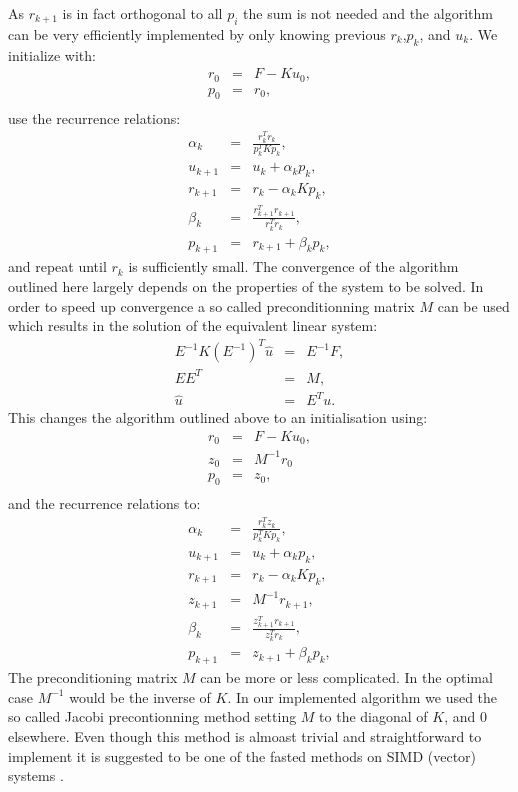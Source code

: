 As $r_{k+1}$ is in fact orthogonal to all $p_i$ the sum is not needed
and the algorithm can be very efficiently implemented by only knowing
previous $r_k$,$p_k$, and $u_k$. We initialize with:
\begin{eqnarray}
  r_0&=&F - Ku_0, \\
  p_0&=&r_0, \\
\end{eqnarray}
use the recurrence relations:
\begin{eqnarray}
  \alpha_k&=&\frac{r_k^{T}r_k}{p_k^{T}Kp_k}, \label{eqn-rec-1} \\
  u_{k+1}&=&u_{k}+\alpha_kp_k, \label{eqn-rec-2} \\
  r_{k+1}&=&r_k - \alpha_kKp_k, \label{eqn-rec-3} \\
  \beta_k&=&\frac{r_{k+1}^Tr_{k+1}}{r_k^Tr_k}, \label{eqn-rec-4} \\
  p_{k+1}&=&r_{k+1}+\beta_kp_{k} \label{eqn-rec-5},
\end{eqnarray}
and repeat until $r_k$ is sufficiently small. The convergence of the
algorithm outlined here largely depends on the properties of the
system to be solved. In order to speed up convergence a so called
preconditionning matrix $M$ can be used which results in the solution
of the equivalent linear system:
\begin{eqnarray}
  E^{-1}K(E^{-1})^T\hat{u}&=&E^{-1}F, \\
  EE^{T}&=&M, \\
  \hat{u}&=&E^Tu.
\end{eqnarray}
This changes the algorithm outlined above to an initialisation using:
\begin{eqnarray}
  r_0&=&F - Ku_0, \\
  z_0&=&M^{-1}r_0 \\
  p_0&=&z_0, \\
\end{eqnarray}
and the recurrence relations to:
\begin{eqnarray}
  \alpha_k&=&\frac{r_k^{T}z_k}{p_k^{T}Kp_k}, \label{eqn-recm-1} \\
  u_{k+1}&=&u_{k}+\alpha_kp_k, \label{eqn-recm-2} \\
  r_{k+1}&=&r_k - \alpha_kKp_k, \label{eqn-recm-3} \\
  z_{k+1}&=&M^{-1}r_{k+1}, \label{eqn-recm-4} \\
  \beta_k&=&\frac{z_{k+1}^Tr_{k+1}}{z_k^Tr_k}, \label{eqn-recm-5} \\
  p_{k+1}&=&z_{k+1}+\beta_kp_{k} \label{eqn-recm-6},
\end{eqnarray}
The preconditioning matrix $M$ can be more or less complicated. In
the optimal case $M^{-1}$ would be the inverse of $K$. In
our implemented algorithm we used the so called Jacobi precontionning
method setting $M$ to the diagonal of $K$, and 0 elsewhere. Even
though this method is almoast trivial and straightforward to
implement it is suggested to be one of the fasted methods on SIMD (vector)
systems \cite{precond}.

